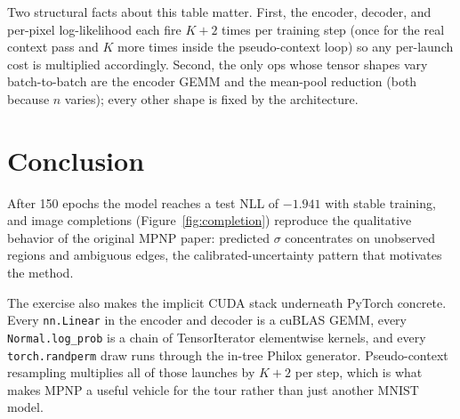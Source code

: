 \documentclass[11pt]{article}
\begin{document}
Two structural facts about this table matter. First, the encoder,
decoder, and per-pixel log-likelihood each fire $K{+}2$ times per
training step (once for the real context pass and $K$ more times
inside the pseudo-context loop) so any per-launch cost is multiplied
accordingly. Second, the only ops whose tensor shapes vary
batch-to-batch are the encoder GEMM and the mean-pool reduction (both
because $n$ varies); every other shape is fixed by the architecture.

\section{Conclusion}

After 150 epochs the model reaches a test NLL of $-1.941$ with stable
training, and image completions (Figure~\ref{fig:completion})
reproduce the qualitative behavior of the original MPNP paper:
predicted $\sigma$ concentrates on unobserved regions and ambiguous
edges, the calibrated-uncertainty pattern that motivates the method.

The exercise also makes the implicit CUDA stack underneath PyTorch
concrete. Every \texttt{nn.Linear} in the encoder and decoder is a
cuBLAS GEMM, every \texttt{Normal.log\_prob} is a chain of
TensorIterator elementwise kernels, and every \texttt{torch.randperm}
draw runs through the in-tree Philox generator. Pseudo-context
resampling multiplies all of those launches by $K{+}2$ per step,
which is what makes MPNP a useful vehicle for the tour rather than
just another MNIST model.
\end{document}

